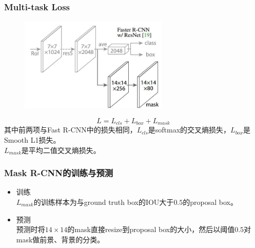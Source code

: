 \documentclass{beamer}
\begin{document}
    \begin{frame}
        \frametitle{Multi-task Loss}
        \begin{figure}
            \centering
            \includegraphics[height=4.5cm]{../graphic/headmask.jpg}
        \end{figure}
        $$L=L_{cls}+L_{box}+L_{mask}$$
        其中前两项与Fast R-CNN中的损失相同，$L_{cls}$是softmax的交叉熵损失，$L_{box}$是Smooth L1损失。\\
        $L_{mask}$是平均二值交叉熵损失。
    \end{frame}

    \begin{frame}
        \frametitle{Mask R-CNN的训练与预测}
        \begin{itemize}
            \item 训练 \\
            $L_{mask}$的训练样本为与ground truth box的IOU大于$0.5$的proposal box。  \\  
            \vspace{20pt}
            \item 预测 \\
            预测时将$14\times 14$的mask直接resize到proposal box的大小，然后以阈值$0.5$对mask做前景、背景的分类。
        \end{itemize}
    \end{frame}

    
\end{document}
